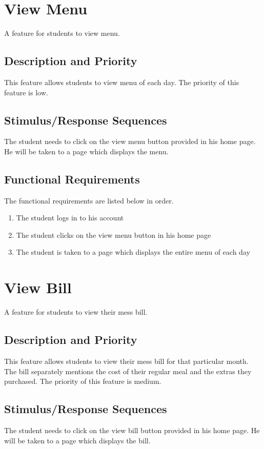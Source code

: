 \documentclass{scrreprt}
\begin{document}
\section{View Menu}
A feature for students to view menu.

\subsection{Description and Priority}
This feature allows students to view menu of each day.  The priority of this feature is low.

\subsection{Stimulus/Response Sequences}
The student needs to click on the view menu button provided in his home page. He will be taken to a page which displays the menu.

\subsection{Functional Requirements}
The functional requirements are listed below in order.

\begin{enumerate}
    \item The student logs in to his account
    \item The student clicks on the view menu button in his home page
    \item The student is taken to a page which displays the entire menu of each day
    
\end{enumerate} 

\section{View Bill}
A feature for students to view their mess bill.

\subsection{Description and Priority}
This feature allows students to view their mess bill for that particular month. The bill separately mentions the cost of their regular meal and the extras they purchased.  The priority of this feature is medium.

\subsection{Stimulus/Response Sequences}
The student needs to click on the view bill button provided in his home page. He will be taken to a page which displays the bill.
\end{document}

